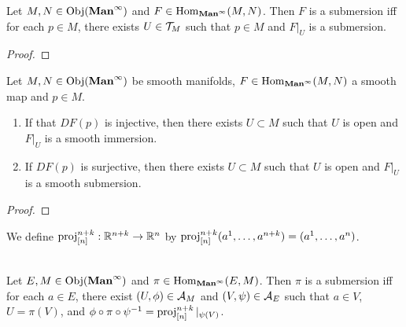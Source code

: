 \documentclass{book}
\begin{document}
	\begin{ex} 
		Let $M,N  \in \operatorname{Obj}(\operatorname*{\text{\textbf{Man}}^{\infty}})$ and  $F \in \operatorname{Hom}_{\operatorname*{\text{\textbf{Man}}^{\infty}}}(M, N)$. Then $F$ is a submersion iff for each $p \in M$, there exists $U \in \mathcal{T}_M$ such that $p \in M$ and $F|_U$ is a submersion.
	\end{ex}
	
	\begin{proof}
	\end{proof}
	
	\begin{ex} 
		Let $M,N \in \operatorname{Obj}(\operatorname*{\text{\textbf{Man}}^{\infty}})$ be smooth manifolds, $F \in \operatorname{Hom}_{\operatorname*{\text{\textbf{Man}}^{\infty}}}(M,N)$ a smooth map and $p \in M$.
		\begin{enumerate}
			\item If that $DF(p)$ is injective, then there exists $U \subset M$ such that $U$ is open and $F|_U$ is a smooth immersion.
			\item If $DF(p)$ is surjective, then there exists $U \subset M$ such that $U$ is open and $F|_U$ is a smooth submersion.
		\end{enumerate}
	\end{ex}

	\begin{proof}
	\end{proof}	

	\begin{note}
		We define $\operatorname{\text{proj}}^{n+k}_{[n]}: \mathbb{R}^{n+k} \rightarrow \mathbb{R}^n$ by $\operatorname{\text{proj}}^{n+k}_{[n]}(a^1, \ldots, a^{n+k}) = (a^1, \ldots, a^n)$.
	\end{note}

	\begin{ex}   \\
		Let $E, M \in \operatorname{Obj}(\operatorname*{\text{\textbf{Man}}^{\infty}})$ and $\pi \in \operatorname{Hom}_{\operatorname*{\text{\textbf{Man}}^{\infty}}}(E, M)$. Then $\pi$ is a submersion iff for each $a \in E$, there exist $(U, \phi) \in \mathcal{A}_M$ and $(V, \psi) \in \mathcal{A}_E$ such that $a \in V$, $U = \pi(V)$, and $\phi \circ \pi \circ \psi^{-1} = \operatorname{\text{proj}}^{n+k}_{[n]}|_{\psi(V)}$.
	\end{ex}
\end{document}
